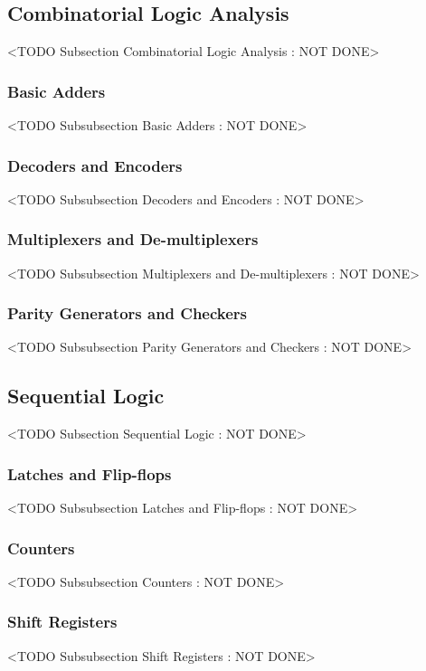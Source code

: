\subsection{Combinatorial Logic Analysis}
	<TODO Subsection Combinatorial Logic Analysis : NOT DONE>

\subsubsection{Basic Adders}
	<TODO Subsubsection  Basic Adders : NOT DONE>

\subsubsection{Decoders and Encoders}
	<TODO Subsubsection  Decoders and Encoders : NOT DONE>

\subsubsection{Multiplexers and De-multiplexers}
	<TODO Subsubsection  Multiplexers and De-multiplexers : NOT DONE>

\subsubsection{Parity Generators and Checkers}
	<TODO Subsubsection  Parity Generators and Checkers : NOT DONE>

\subsection{Sequential Logic}
	<TODO Subsection Sequential Logic : NOT DONE>

\subsubsection{Latches and Flip-flops}
	<TODO Subsubsection  Latches and Flip-flops : NOT DONE>

\subsubsection{Counters}
	<TODO Subsubsection  Counters : NOT DONE>

\subsubsection{Shift Registers}
	<TODO Subsubsection  Shift Registers : NOT DONE>

